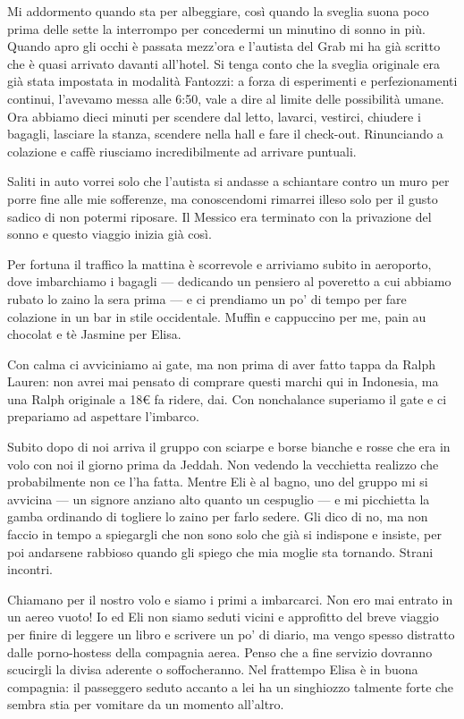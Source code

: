 Mi addormento quando sta per albeggiare, così quando la sveglia suona poco prima delle sette la interrompo per concedermi un minutino di sonno in più. Quando apro gli occhi è passata mezz'ora e l'autista del Grab mi ha già scritto che è quasi arrivato davanti all'hotel. Si tenga conto che la sveglia originale era già stata impostata in modalità Fantozzi: a forza di esperimenti e perfezionamenti continui, l'avevamo messa alle 6:50, vale a dire al limite delle possibilità umane. Ora abbiamo dieci minuti per scendere dal letto, lavarci, vestirci, chiudere i bagagli, lasciare la stanza, scendere nella hall e fare il check-out. Rinunciando a colazione e caffè riusciamo incredibilmente ad arrivare puntuali.

Saliti in auto vorrei solo che l'autista si andasse a schiantare contro un muro per porre fine alle mie sofferenze, ma conoscendomi rimarrei illeso solo per il gusto sadico di non potermi riposare. Il Messico era terminato con la privazione del sonno e questo viaggio inizia già così.

Per fortuna il traffico la mattina è scorrevole e arriviamo subito in aeroporto, dove imbarchiamo i bagagli — dedicando un pensiero al poveretto a cui abbiamo rubato lo zaino la sera prima — e ci prendiamo un po' di tempo per fare colazione in un bar in stile occidentale. Muffin e cappuccino per me, pain au chocolat e tè Jasmine per Elisa.

Con calma ci avviciniamo ai gate, ma non prima di aver fatto tappa da Ralph Lauren: non avrei mai pensato di comprare questi marchi qui in Indonesia, ma una Ralph originale a 18€ fa ridere, dai. Con nonchalance superiamo il gate e ci prepariamo ad aspettare l'imbarco.

Subito dopo di noi arriva il gruppo con sciarpe e borse bianche e rosse che era in volo con noi il giorno prima da Jeddah. Non vedendo la vecchietta realizzo che probabilmente non ce l'ha fatta. Mentre Eli è al bagno, uno del gruppo mi si avvicina — un signore anziano alto quanto un cespuglio — e mi picchietta la gamba ordinando di togliere lo zaino per farlo sedere. Gli dico di no, ma non faccio in tempo a spiegargli che non sono solo che già si indispone e insiste, per poi andarsene rabbioso quando gli spiego che mia moglie sta tornando. Strani incontri.

Chiamano per il nostro volo e siamo i primi a imbarcarci. Non ero mai entrato in un aereo vuoto! Io ed Eli non siamo seduti vicini e approfitto del breve viaggio per finire di leggere un libro e scrivere un po' di diario, ma vengo spesso distratto dalle porno-hostess della compagnia aerea. Penso che a fine servizio dovranno scucirgli la divisa aderente o soffocheranno. Nel frattempo Elisa è in buona compagnia: il passeggero seduto accanto a lei ha un singhiozzo talmente forte che sembra stia per vomitare da un momento all'altro.

